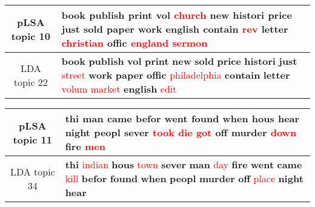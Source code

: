 \begin{center}\begin{tabularx}{\textwidth} {
  | c | >{\raggedright\arraybackslash}X | } \hline 
pLSA topic 10 & \textbf{book} \textbf{publish} \textbf{print} \textbf{vol} \textcolor{red}{church} \textbf{new} \textbf{histori} \textbf{price} \textbf{just} \textbf{sold} \textbf{paper} \textbf{work} \textbf{english} \textbf{contain} \textcolor{red}{rev} \textbf{letter} \textcolor{red}{christian} \textbf{offic} \textcolor{red}{england} \textcolor{red}{sermon} \\ \hline 
LDA topic 22 & \textbf{book} \textbf{publish} \textbf{vol} \textbf{print} \textbf{new} \textbf{sold} \textbf{price} \textbf{histori} \textbf{just} \textcolor{red}{street} \textbf{work} \textbf{paper} \textbf{offic} \textcolor{red}{philadelphia} \textbf{contain} \textbf{letter} \textcolor{red}{volum} \textcolor{red}{market} \textbf{english} \textcolor{red}{edit} \\ \hline 
\end{tabularx}

\end{center}

\begin{center}\begin{tabularx}{\textwidth} {
  | c | >{\raggedright\arraybackslash}X | } \hline 
pLSA topic 11 & \textbf{thi} \textbf{man} \textbf{came} \textbf{befor} \textbf{went} \textbf{found} \textbf{when} \textbf{hous} \textbf{hear} \textbf{night} \textbf{peopl} \textbf{sever} \textcolor{red}{took} \textcolor{red}{die} \textcolor{red}{got} \textbf{off} \textbf{murder} \textcolor{red}{down} \textbf{fire} \textcolor{red}{men} \\ \hline 
LDA topic 34 & \textbf{thi} \textcolor{red}{indian} \textbf{hous} \textcolor{red}{town} \textbf{sever} \textbf{man} \textcolor{red}{day} \textbf{fire} \textbf{went} \textbf{came} \textcolor{red}{kill} \textbf{befor} \textbf{found} \textbf{when} \textbf{peopl} \textbf{murder} \textbf{off} \textcolor{red}{place} \textbf{night} \textbf{hear} \\ \hline 
\end{tabularx}

\end{center}

